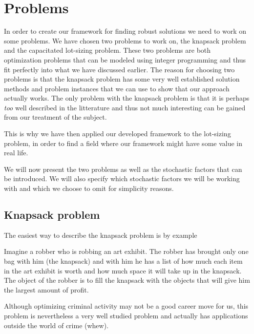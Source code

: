 \chapter{Problems}
\label{sec:problem}

In order to create our framework for finding robust solutions we need
to work on some problems. We have chosen two problems to work on, the
knapsack problem and the capacitated lot-sizing problem. These two problems are
both optimization problems that can be modeled using integer
programming and thus fit perfectly into what we have discussed
earlier. The reason for choosing two problems is that the knapsack
problem has some very well established solution methods and problem
instances that we can use to show that our approach actually
works. The only problem with the knapsack problem is that it is
perhaps \emph{too} well described in the litterature and thus not much
interesting can be gained from our treatment of the subject.

This is why we have then applied our developed framework to the
lot-sizing problem, in order to find a field where our framework might
have some value in real life. 


We will now present the two problems as well as the stochastic factors
that can be introduced. We will also specify which stochastic factors
we will be working with and which we choose to omit for simplicity
reasons.

\section{Knapsack problem}
\label{sec:knapsack_problem}

The easiest way to describe the knapsack problem is by example
\begin{example}
Imagine a robber who is robbing an art exhibit. The robber has brought
only one bag with him (the knapsack) and with him he has a list of how
much each item in the art exhibit is worth and how much space it will
take up in the knapsack. The object of the robber is to fill the
knapsack with the objects that will give him the largest amount of
profit.
\end{example}
Although optimizing criminal activity may not be a good career move
for us, this problem is nevertheless a very well studied problem and
actually has applications outside the world of crime (whew).

